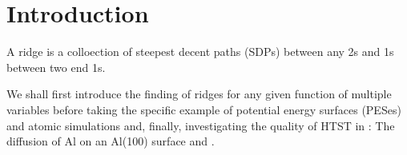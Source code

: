 \section{Introduction}

A ridge is a colloection of steepest decent paths (SDPs) between any \sap2s and \sap1s between two end \sap1s.

We shall first introduce the finding of ridges for any given function of multiple variables before taking the specific example of potential energy surfaces (PESes) and atomic simulations and,
finally, investigating the quality of HTST in :
The diffusion of Al on an Al(100) surface and .

\incomplete
